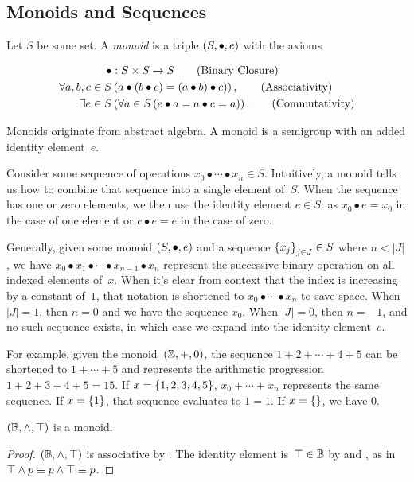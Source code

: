 \subsection{Monoids and Sequences}
\begin{definition}[Monoid]
  Let $S$ be some set.  A \emph{monoid} is a triple $\left({S},{\bullet},{e}\right)$
    with the axioms

  \begin{align}
    \bullet &: S\times S \rightarrow S
      \tag{Binary Closure} \\
    \Forall{a,b,c\in S&}{a\bullet(b\bullet c) = (a\bullet b)\bullet c)},
      \tag{Associativity} \\
    \Exists{e\in S&}{\Forall{a\in S}{e\bullet a = a\bullet e = a}}.
      \tag{Commutativity}
  \end{align}
\end{definition}

Monoids originate from abstract algebra.
A monoid is a semigroup with an added identity element~$e$.

Consider some sequence of operations
  $x_0 \bullet\cdots\bullet x_n \in S$.
Intuitively,
  a monoid tells us how to combine that sequence into a single element
  of~$S$.
When the sequence has one or zero elements,
  we then use the identity element $e\in S$:
    as $x_0 \bullet e = x_0$ in the case of one element
    or $e \bullet e = e$ in the case of zero.

Generally,
  given some monoid $\left({S},{\bullet},{e}\right)$ and a sequence $\left\{x_{j}\right\}_{j\in J}\in S$
  where $n<|J|$,
    we have
    $x_0\bullet x_1\bullet\cdots\bullet x_{n-1}\bullet x_n$
    represent the successive binary operation on all indexed elements
    of~$x$.
When it's clear from context that the index is increasing by a constant
  of~$1$,
    that notation is shortened to $x_0\bullet\cdots\bullet x_n$ to save
    space.
When $|J|=1$, then $n=0$ and we have the sequence $x_0$.
When $|J|=0$, then $n=-1$,
  and no such sequence exists,
  in which case we expand into the identity element~$e$.

For example,
  given the monoid~$\left({\mathbb{Z}},{+},{0}\right)$,
  the sequence $1+2+\cdots+4+5$ can be shortened to
    $1+\cdots+5$ and represents the arithmetic progression
    $1+2+3+4+5=15$.
If $x=\left\{1,2,3,4,5\right\}$,
  $x_0+\cdots+x_n$ represents the same sequence.
If $x=\left\{1\right\}$,
  that sequence evaluates to $1=1$.
If $x=\left\{\right\}$,
  we have $0$.

\begin{lemma}
  $\left({\mathbb{B}},{\land},{\top}\right)$ is a monoid.
\end{lemma}
\begin{proof}
  $\left({\mathbb{B}},{\land},{\top}\right)$ is associative by .
  The identity element is~$\top\in\mathbb{B}$ by  and
    ,
      as in $\top \land p \equiv p \land \top \equiv p$.
\end{proof}

